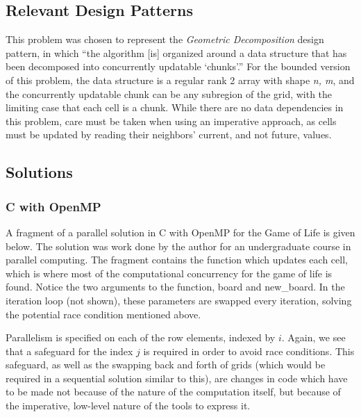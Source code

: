 \subsection{Relevant Design Patterns}
This problem was chosen to represent the \textit{Geometric Decomposition} design pattern, \cite{mass}
in which ``the algorithm [is] organized around a data structure that has been decomposed into concurrently updatable `chunks'.''
For the bounded version of this problem, 
the data structure is a regular rank 2 array with shape \textit{n, m}, 
and the concurrently updatable chunk can be any subregion of the grid, 
with the limiting case that each cell is a chunk. 
While there are no data dependencies in this problem, 
care must be taken when using an imperative approach, 
as cells must be updated by reading their neighbors' current, and not future, values.

\subsection{Solutions}
\subsubsection{C with OpenMP}
A fragment of a parallel solution in C with OpenMP for the Game of Life is given below. 
The solution was work done by the author for an undergraduate course in parallel computing.
The fragment contains the function which updates each cell, 
which is where most of the computational concurrency for the game of life is found. 
Notice the two arguments to the function, \ttfamily board \normalfont and \ttfamily new\_board\normalfont.
In the iteration loop (not shown), these parameters are swapped every iteration, 
solving the potential race condition mentioned above.

\begin{singlespacing}
\begin{small}

\end{small}
\end{singlespacing}

Parallelism is specified on each of the row elements, indexed by $i$.
Again, we see that a safeguard for the index $j$ is required in order to avoid race conditions. 
This safeguard, as well as the swapping back and forth of grids (which would be required in a sequential solution similar to this), 
are changes in code which have to be made not because of the nature of the computation itself, 
but because of the imperative, low-level nature of the tools to express it.

